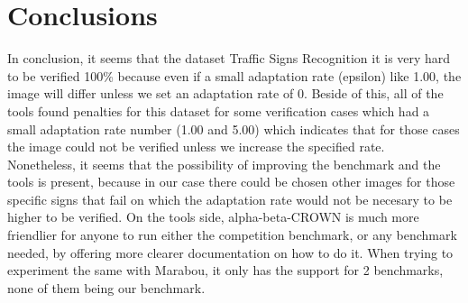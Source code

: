 \documentclass[12pt,a4paper]{report}
\newcommand\tab[1][5mm]{\hspace*{#1}}
\begin{document}
\chapter{Conclusions}
\tab In conclusion, it seems that the dataset Traffic Signs Recognition\cite{traffic_signs_recognition} it is very hard to be verified 100\% because even if a small adaptation rate (epsilon) like 1.00, the image will differ unless we set an adaptation rate of 0. Beside of this, all of the tools found penalties for this dataset for some verification cases which had a small adaptation rate number (1.00 and 5.00) which indicates that for those cases the image could not be verified unless we increase the specified rate.\\
\tab Nonetheless, it seems that the possibility of improving the benchmark and the tools is present, because in our case there could be chosen other images for those specific signs that fail on which the adaptation rate would not be necesary to be higher to be verified. On the tools side, alpha-beta-CROWN is much more friendlier for anyone to run either the competition benchmark, or any benchmark needed, by offering more clearer documentation on how to do it. When trying to experiment the same with Marabou, it only has the support for 2 benchmarks, none of them being our benchmark.



\end{document}
